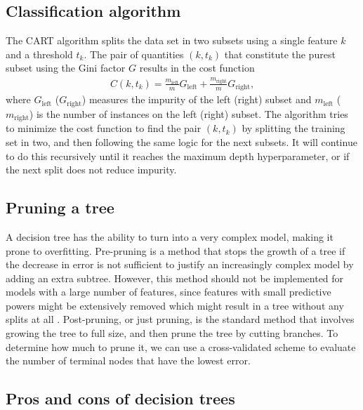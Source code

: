 \subsection{Classification algorithm}
The CART algorithm splits the data set in two subsets using a single feature $k$ and a threshold $t_k$. The pair of quantities $(k,t_k)$ that constitute the purest subset using the Gini factor $G$ results in the cost function
\begin{align}
  C(k, t_k) = \frac{m_{\text{left}}}{m}G_{\text{left}} + \frac{m_{\text{right}}}{m}G_{\text{right}},
\end{align}
where $G_{\text{left}}$ ($G_{\text{right}}$) measures the impurity of the left (right) subset and $m_{\text{left}}$  ($m_{\text{right}}$) is the number of instances on the left (right) subset. The algorithm tries to minimize the cost function to find the pair $(k,t_k)$ by splitting the training set in two, and then following the same logic for the next subsets. It will continue to do this recursively until it reaches the maximum depth hyperparameter, or if the next split does not reduce impurity.

\subsection{Pruning a tree}

A decision tree has the ability to turn into a very complex model, making it prone to overfitting. Pre-pruning is a method that stops the growth of a tree if the decrease in error is not sufficient to justify an increasingly complex model by adding an extra subtree. However, this method should not be implemented for models with a large number of features, since features with small predictive powers might be extensively removed which might result in a tree without any splits at all \cite{Murphy2012}. Post-pruning, or just pruning, is the standard method that involves growing the tree to full size, and then prune the tree by cutting branches. To determine how much to prune it, we can use a cross-validated scheme to evaluate the number of terminal nodes that have the lowest error.


\subsection{Pros and cons of decision trees}

